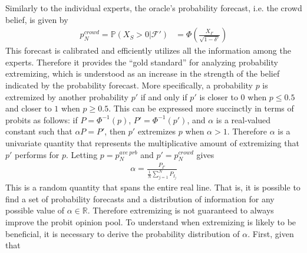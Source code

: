 \documentclass[11pt]{article}
\renewcommand{\P}{\mathbb{P}}
\theoremstyle{definition}
\theoremstyle{definition}
\begin{document}
Similarly to the individual experts, the oracle's probability forecast, i.e. the crowd belief, is given by 
 \begin{align}
p^{crowd}_N = \P(X_S > 0 |  \mathcal{F}') &= \Phi\left( \frac{X_{I'}}{\sqrt{1-\delta'}} \right)
\end{align}
This forecast is calibrated and efficiently utilizes all the information among the experts. Therefore it provides the ``gold standard'' for analyzing probability extremizing, which is understood as an increase in the strength of the belief indicated by the probability forecast. More specifically, a probability $p$ is extremized by another probability $p'$ if and only if $p'$ is closer to $0$ when $p \leq 0.5$ and closer to $1$ when $p \geq 0.5$. This can be expressed more succinctly in terms of probits as follows: if $P = \Phi^{-1}(p)$, $P' = \Phi^{-1}(p')$, and $\alpha$ is a real-valued constant such that $\alpha P = P'$, then $p'$ extremizes $p$ when $\alpha > 1$. Therefore $\alpha$ is a univariate quantity that represents the multiplicative amount of extremizing that $p'$ performs for $p$. Letting $p= p_{N}^{ave\ prb}$ and $p' = p_N^{crowd}$ gives
\begin{align}
\alpha  = \frac{P_{I'}}{\frac{1}{N}\sum_{j=1}^N P_{I_j}}\label{alpha}
\end{align}
This is a random quantity that spans the entire real line. That is, it is possible to find a set of probability forecasts and a distribution of information for any possible value of $\alpha \in \mathbb{R}$. Therefore extremizing is not guaranteed to always improve the probit opinion pool. To understand when extremizing is likely to be beneficial, it is necessary to derive the probability distribution of $\alpha$. First, given that 
\end{document}
